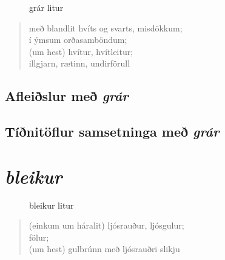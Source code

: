 \documentclass[12pt,b5paper,twosided,openany]{book}
\begin{document}
\begin{figure}[H]
\begin{tcolorbox}
	\centering
\end{tcolorbox}
	\caption{grár litur}
	\label{mynd:gratt}
\end{figure}

\begin{quote}
með blandlit hvíts og svarts, misdökkum; \\
í ýmsum orðasamböndum; \\
(um hest) hvítur, hvítleitur; \\
illgjarn, rætinn, undirförull
\end{quote}
\clearpage

\section{Afleiðslur með \textit{grár}}
\label{afl:grafl}


\section{Tíðnitöflur samsetninga með \textit{grár}}
\label{tidni:gratid}


\chapter{\textit{bleikur}}
\label{kafli:bleikur}

\begin{figure}[H]
\begin{tcolorbox}
	\centering
\end{tcolorbox}
	\caption{bleikur litur}
	\label{mynd:bleikt}
\end{figure}

\begin{quote}
(einkum um háralit) ljósrauður, ljósgulur; \\
fölur; \\
(um hest) gulbrúnn með ljósrauðri slikju
\end{quote}
\clearpage
\end{document}
